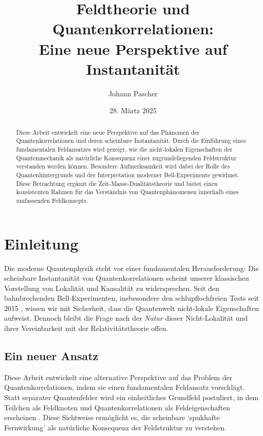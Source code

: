 \documentclass[a4paper,12pt]{article}
\title{Feldtheorie und Quantenkorrelationen: \\ Eine neue Perspektive auf Instantanität}
\author{Johann Pascher}
\date{28. Märtz 2025}
\begin{document}
	\maketitle
	
	\begin{abstract}
		Diese Arbeit entwickelt eine neue Perspektive auf das Phänomen der Quantenkorrelationen und deren scheinbare Instantanität. Durch die Einführung eines fundamentalen Feldansatzes wird gezeigt, wie die nicht-lokalen Eigenschaften der Quantenmechanik als natürliche Konsequenz einer zugrundeliegenden Feldstruktur verstanden werden können. Besondere Aufmerksamkeit wird dabei der Rolle des Quantenhintergrunds und der Interpretation moderner Bell-Experimente gewidmet. Diese Betrachtung ergänzt die Zeit-Masse-Dualitätstheorie und bietet einen konsistenten Rahmen für das Verständnis von Quantenphänomenen innerhalb eines umfassenden Feldkonzepts.
	\end{abstract}
	
	\tableofcontents
	
	\section{Einleitung}
	
	Die moderne Quantenphysik steht vor einer fundamentalen Herausforderung: Die scheinbare Instantanität von Quantenkorrelationen scheint unserer klassischen Vorstellung von Lokalität und Kausalität zu widersprechen. Seit den bahnbrechenden Bell-Experimenten, insbesondere den schlupflochfreien Tests seit 2015 \cite{Hensen2015}, wissen wir mit Sicherheit, dass die Quantenwelt nicht-lokale Eigenschaften aufweist. Dennoch bleibt die Frage nach der \textit{Natur} dieser Nicht-Lokalität und ihrer Vereinbarkeit mit der Relativitätstheorie offen.
	
	\subsection{Ein neuer Ansatz}
	
	Diese Arbeit entwickelt eine alternative Perspektive auf das Problem der Quantenkorrelationen, indem sie einen fundamentalen Feldansatz vorschlägt. Statt separater Quantenfelder wird ein einheitliches Grundfeld postuliert, in dem Teilchen als Feldknoten und Quantenkorrelationen als Feldeigenschaften erscheinen \cite{Wilczek2008}. Diese Sichtweise ermöglicht es, die scheinbare `spukhafte Fernwirkung' als natürliche Konsequenz der Feldstruktur zu verstehen.
	
\end{document}
